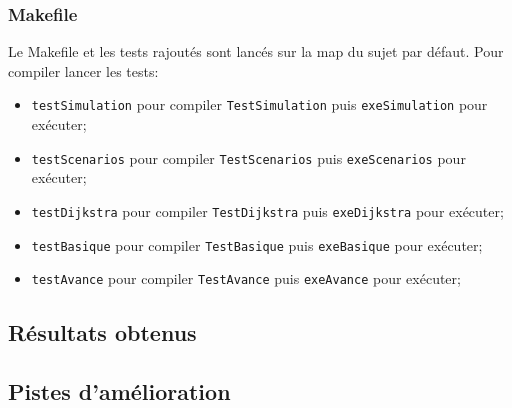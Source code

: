 \documentclass[a4paper,8pt]{article} %
\begin{document}
\subsubsection{Makefile}
Le Makefile et les tests rajoutés sont lancés sur la map du sujet par défaut.
Pour compiler lancer les tests: 
\begin{itemize}
    \item \texttt{testSimulation} pour compiler \texttt{TestSimulation} puis \texttt{exeSimulation} pour exécuter;
    \item \texttt{testScenarios} pour compiler \texttt{TestScenarios} puis \texttt{exeScenarios} pour exécuter;
    \item \texttt{testDijkstra} pour compiler \texttt{TestDijkstra} puis \texttt{exeDijkstra} pour exécuter;
    \item \texttt{testBasique} pour compiler \texttt{TestBasique} puis \texttt{exeBasique} pour exécuter;
    \item \texttt{testAvance} pour compiler \texttt{TestAvance} puis \texttt{exeAvance} pour exécuter;
\end{itemize}


\subsection{Résultats obtenus}
\subsection{Pistes d'amélioration}
\end{document}
